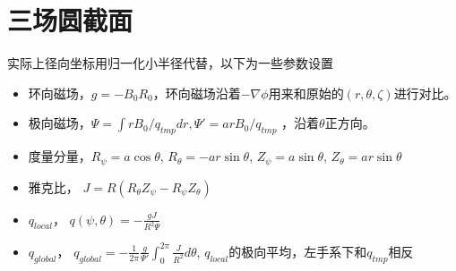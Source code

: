 \documentclass[11pt,a4paper]{article}
\begin{document}
%
%


\section{三场圆截面}
实际上径向坐标用归一化小半径代替，以下为一些参数设置
\begin{itemize}
	\item 环向磁场，$ g = -B_0R_0 $，环向磁场沿着$-\nabla\phi$用来和原始的$(r,\theta,\zeta)$进行对比。
	\item 极向磁场，$ \Psi = \int{ rB_0/q_{tmp} dr}, \Psi' = arB_0/q_{tmp} $ ，沿着$\theta$正方向。
	\item 度量分量，$ R_\psi = a\cos\theta $, $ R_\theta = -ar\sin\theta $, $ Z_\psi = a\sin\theta $, $ Z_\theta = ar\sin\theta $
	\item 雅克比， $ J = R( R_\theta Z_\psi-R_\psi Z_\theta ) $
	\item $q_{local}$， $ q(\psi,\theta) = -\frac{gJ}{R^2 \Psi} $
	\item $q_{global}$， $ q_{global} = -\frac{1}{2\pi}\frac{g}{\Psi'}\int_{0}^{2\pi}\frac{J}{R^2}d\theta $, $q_{local}$的极向平均，左手系下和$q_{tmp}$相反
\end{itemize}
\end{document}
